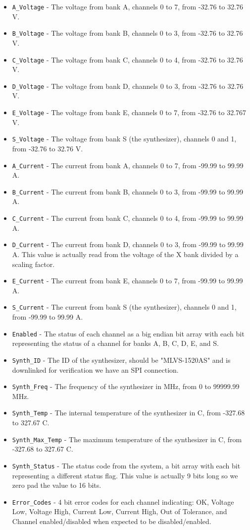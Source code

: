 \begin{itemize}
    \item \texttt{A\_Voltage} - The voltage from bank A, channels 0 to 7, from -32.76 to 32.76 V.
    \item \texttt{B\_Voltage} - The voltage from bank B, channels 0 to 3, from -32.76 to 32.76 V.
    \item \texttt{C\_Voltage} - The voltage from bank C, channels 0 to 4, from -32.76 to 32.76 V.
    \item \texttt{D\_Voltage} - The voltage from bank D, channels 0 to 3, from -32.76 to 32.76 V.
    \item \texttt{E\_Voltage} - The voltage from bank E, channels 0 to 7, from -32.76 to 32.767 V.
    \item \texttt{S\_Voltage} - The voltage from bank S (the synthesizer), channels 0 and 1, from -32.76 to 32.76 V.
    \item \texttt{A\_Current} - The current from bank A, channels 0 to 7, from -99.99 to 99.99 A.
    \item \texttt{B\_Current} - The current from bank B, channels 0 to 3, from -99.99 to 99.99 A.
    \item \texttt{C\_Current} - The current from bank C, channels 0 to 4, from -99.99 to 99.99 A.
    \item \texttt{D\_Current} - The current from bank D, channels 0 to 3, from -99.99 to 99.99 A. This value is actually read from the voltage of the X bank divided by a scaling factor. 
    \item \texttt{E\_Current} - The current from bank E, channels 0 to 7, from -99.99 to 99.99 A.
    \item \texttt{S\_Current} - The current from bank S (the synthesizer), channels 0 and 1, from -99.99 to 99.99 A.
    \item \texttt{Enabled} - The status of each channel as a big endian bit array with each bit representing the status of a channel for banks A, B, C, D, E, and S.
    \item \texttt{Synth\_ID} - The ID of the synthesizer, should be "MLVS-1520AS" and is downlinked for verification we have an SPI connection.
    \item \texttt{Synth\_Freq} - The frequency of the synthesizer in MHz, from 0 to 99999.99 MHz.
    \item \texttt{Synth\_Temp} - The internal temperature of the synthesizer in C, from -327.68 to 327.67 C.
    \item \texttt{Synth\_Max\_Temp} - The maximum temperature of the synthesizer in C, from -327.68 to 327.67 C.
    \item \texttt{Synth\_Status} - The status code from the system, a bit array with each bit representing a different status flag. This value is actually 9 bits long so we zero pad the value to 16 bits.
    \item \texttt{Error\_Codes} - 4 bit error codes for each channel indicating: OK, Voltage Low, Voltage High, Current Low, Current High, Out of Tolerance, and Channel enabled/disabled when expected to be disabled/enabled.
\end{itemize}
